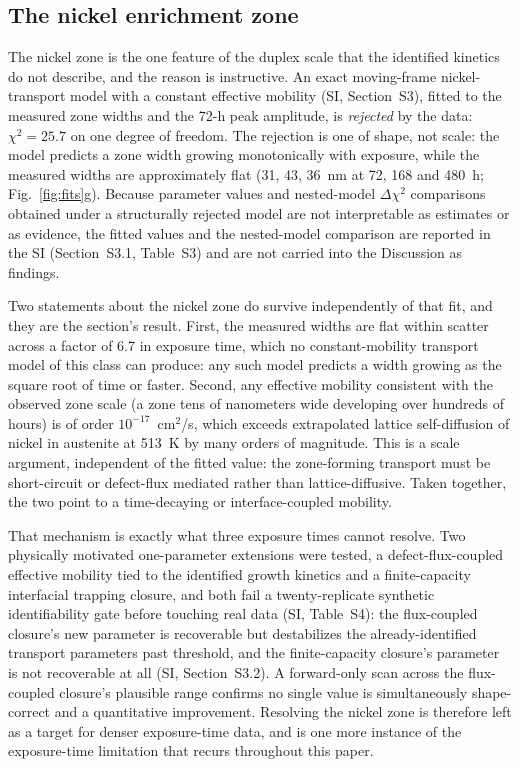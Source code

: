 \documentclass[a4paper,fleqn]{cas-sc}
\begin{document}
\subsection{The nickel enrichment zone}\label{sec:nickel}

The nickel zone is the one feature of the duplex scale that the
identified kinetics do not describe, and the reason is instructive. An
exact moving-frame nickel-transport model with a constant effective
mobility (SI, Section~S3), fitted to the measured zone widths and the
72-h peak amplitude, is \emph{rejected} by the data: $\chi^2 = 25.7$ on
one degree of freedom. The rejection is one of shape, not scale: the
model predicts a zone width growing monotonically with exposure, while
the measured widths are approximately flat (31, 43, 36~nm at 72, 168 and
480~h; Fig.~\ref{fig:fits}g). Because parameter values and nested-model $\Delta\chi^2$
comparisons obtained under a structurally rejected model are not
interpretable as estimates or as evidence, the fitted values and the
nested-model comparison are reported in the SI (Section~S3.1,
Table~S3) and are not carried into the Discussion as findings.

Two statements about the nickel zone do survive independently of that
fit, and they are the section's result. First, the measured widths are
flat within scatter across a factor of 6.7 in exposure time, which no
constant-mobility transport model of this class can produce: any such
model predicts a width growing as the square root of time or faster.
Second, any effective mobility consistent with the observed zone
scale (a zone tens of nanometers wide developing over hundreds of
hours) is of order $10^{-17}$~cm$^2$/s, which exceeds extrapolated
lattice self-diffusion of nickel in austenite at 513~K by many orders of
magnitude. This is a scale argument, independent of the fitted value: the
zone-forming transport must be short-circuit or defect-flux mediated
rather than lattice-diffusive. Taken together, the two point to a
time-decaying or interface-coupled mobility.

That mechanism is exactly what three exposure times cannot resolve. Two
physically motivated one-parameter extensions were tested, a
defect-flux-coupled effective mobility tied to the identified growth
kinetics and a finite-capacity interfacial trapping closure, and both
fail a twenty-replicate synthetic identifiability gate before touching
real data (SI, Table~S4): the flux-coupled closure's new parameter is
recoverable but destabilizes the already-identified transport parameters
past threshold, and the finite-capacity closure's parameter is not
recoverable at all (SI, Section~S3.2). A forward-only scan across the
flux-coupled closure's plausible range confirms no single value is
simultaneously shape-correct
and a quantitative improvement. Resolving the nickel zone is therefore
left as a target for denser exposure-time data, and is one more instance
of the exposure-time limitation that recurs throughout this paper.
\end{document}
